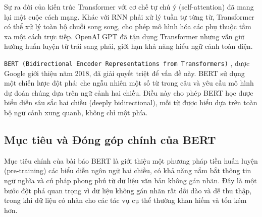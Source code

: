Sự ra đời của kiến trúc Transformer \cite{vaswani2017attention} với cơ chế tự chú ý (self-attention) đã mang lại một cuộc cách mạng. Khác với RNN phải xử lý tuần tự từng từ, Transformer có thể xử lý toàn bộ chuỗi song song, cho phép mô hình hóa các phụ thuộc tầm xa một cách trực tiếp. OpenAI GPT \cite{radford2018improving} đã tận dụng Transformer nhưng vẫn giữ hướng huấn luyện từ trái sang phải, giới hạn khả năng hiểu ngữ cảnh toàn diện.

\texttt{BERT (Bidirectional Encoder Representations from Transformers)} \cite{devlin2018bert}, được Google giới thiệu năm 2018, đã giải quyết triệt để vấn đề này. BERT sử dụng một chiến lược đột phá: che ngẫu nhiên một số từ trong câu và yêu cầu mô hình dự đoán chúng dựa trên ngữ cảnh hai chiều. Điều này cho phép BERT học được biểu diễn sâu sắc hai chiều (deeply bidirectional), mỗi từ được hiểu dựa trên toàn bộ ngữ cảnh xung quanh, không chỉ một phía.

\subsection{Mục tiêu và Đóng góp chính của BERT}
\label{ssec:muc_tieu_dong_gop_bert}
Mục tiêu chính của bài báo BERT \cite{devlin2018bert} là giới thiệu một phương pháp tiền huấn luyện (pre-training) các biểu diễn ngôn ngữ hai chiều, có khả năng nắm bắt thông tin ngữ nghĩa và cú pháp phong phú từ dữ liệu văn bản không gán nhãn. Đây là một bước đột phá quan trọng vì dữ liệu không gán nhãn rất dồi dào và dễ thu thập, trong khi dữ liệu có nhãn cho các tác vụ cụ thể thường khan hiếm và tốn kém hơn.

